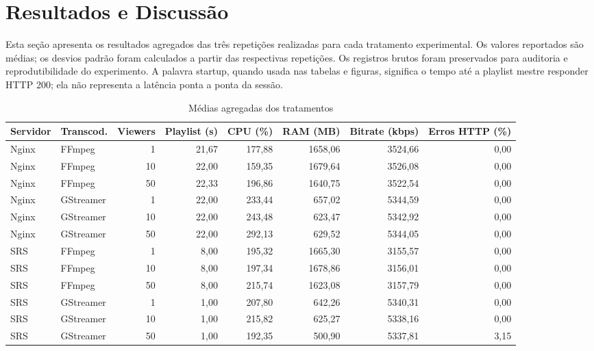 \section{Resultados e Discussão}

Esta seção apresenta os resultados agregados das três repetições realizadas para cada tratamento experimental. Os valores reportados são médias; os desvios padrão foram calculados a partir das respectivas repetições. Os registros brutos foram preservados para auditoria e reprodutibilidade do experimento. A palavra startup, quando usada nas tabelas e figuras, significa o tempo até a playlist mestre responder HTTP 200; ela não representa a latência ponta a ponta da sessão.

\begin{table}[H]
\centering
\scriptsize
\caption{Médias agregadas dos tratamentos}
\begin{tabular}{@{}llrrrrrr@{}}
\toprule
Servidor & Transcod. & Viewers & Playlist (s) & CPU (\%) & RAM (MB) & Bitrate (kbps) & Erros HTTP (\%) \\
\midrule
Nginx & FFmpeg & 1 & 21,67 & 177,88 & 1658,06 & 3524,66 & 0,00 \\
Nginx & FFmpeg & 10 & 22,00 & 159,35 & 1679,64 & 3526,08 & 0,00 \\
Nginx & FFmpeg & 50 & 22,33 & 196,86 & 1640,75 & 3522,54 & 0,00 \\
Nginx & GStreamer & 1 & 22,00 & 233,44 & 657,02 & 5344,59 & 0,00 \\
Nginx & GStreamer & 10 & 22,00 & 243,48 & 623,47 & 5342,92 & 0,00 \\
Nginx & GStreamer & 50 & 22,00 & 292,13 & 629,52 & 5344,05 & 0,00 \\
SRS & FFmpeg & 1 & 8,00 & 195,32 & 1665,30 & 3155,57 & 0,00 \\
SRS & FFmpeg & 10 & 8,00 & 197,34 & 1678,86 & 3156,01 & 0,00 \\
SRS & FFmpeg & 50 & 8,00 & 215,74 & 1623,08 & 3157,79 & 0,00 \\
SRS & GStreamer & 1 & 1,00 & 207,80 & 642,26 & 5340,31 & 0,00 \\
SRS & GStreamer & 10 & 1,00 & 215,82 & 625,27 & 5338,16 & 0,00 \\
SRS & GStreamer & 50 & 1,00 & 192,35 & 500,90 & 5337,81 & 3,15 \\
\bottomrule
\end{tabular}
\end{table}

